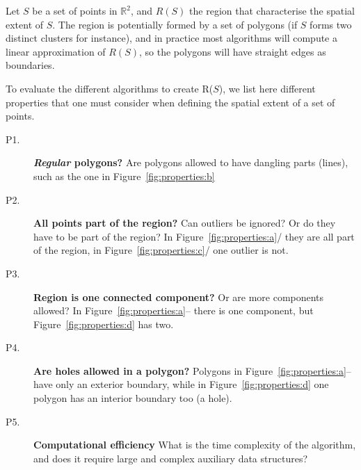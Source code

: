 Let $S$ be a set of points in $\mathbb{R}^2$, and $R(S)$ the region that characterise the spatial extent of $S$.
The region is potentially formed by a set of polygons (if $S$ forms two distinct clusters for instance), and in practice most algorithms will compute a linear approximation of $R(S)$, so the polygons will have straight edges as boundaries.

To evaluate the different algorithms to create R($S$), we list here different properties that one must consider when defining the spatial extent of a set of points.
\begin{description}
  \item[P1.] \textbf{\emph{Regular} polygons?} Are polygons allowed to have dangling parts (lines), such as the one in Figure~\ref{fig:properties:b}
  \item[P2.] \textbf{All points part of the region?} Can outliers be ignored? Or do they have to be part of the region? In Figure~\ref{fig:properties:a}/ they are all part of the region, in Figure~\ref{fig:properties:c}/ one outlier is not.
  \item[P3.] \textbf{Region is one connected component?} Or are more components allowed? In Figure~\ref{fig:properties:a}-- there is one component, but Figure~\ref{fig:properties:d} has two.
  \item[P4.] \textbf{Are holes allowed in a polygon?} Polygons in Figure~\ref{fig:properties:a}-- have only an exterior boundary, while in Figure~\ref{fig:properties:d} one polygon has an interior boundary too (a hole).
  \item[P5.] \textbf{Computational efficiency} What is the time complexity of the algorithm, and does it require large and complex auxiliary data structures?
\end{description}
